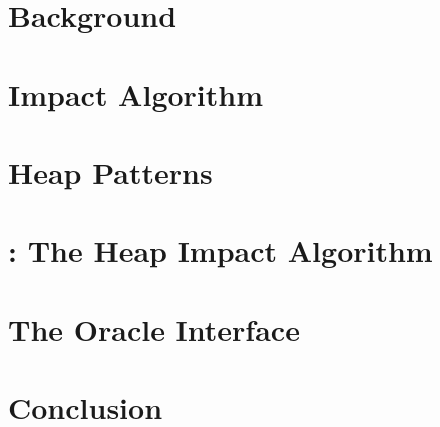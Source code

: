 \documentclass[12pt, letterpaper]{report}
\begin{document}
\chapter{Background}


\chapter{Impact Algorithm}


\chapter{Heap Patterns}


\chapter{\verifier: The Heap Impact Algorithm}


\chapter{The Oracle Interface}


\chapter{Conclusion}


% 

% 

% 

% 

% 

% 


\small

\end{document}
